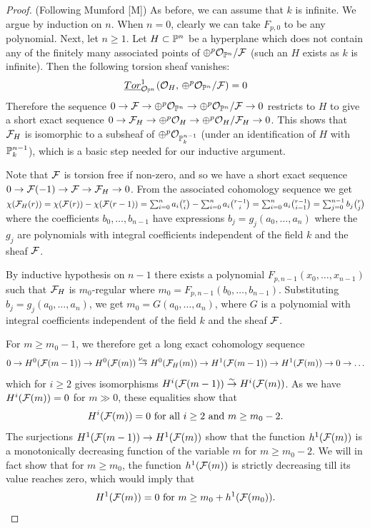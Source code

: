 \begin{proof} (Following Mumford [M])
As before, we can assume that $k$ is infinite. We argue by induction on $n$.
When $n=0$, clearly we can take $F_{p,0}$ to be any polynomial.
Next, let $n\ge 1$.
Let $H\subset \mathbb{P}^n$ be a hyperplane which does not contain
any of the finitely many associated points of
$\oplus^p{\mathcal O}_{\mathbb{P}^n}/\mathcal{F}$ (such an $H$ exists as $k$ is infinite).
Then the following torsion sheaf vanishes:
$$\underline{Tor}^1_{{\mathcal O}_{\mathbb{P}^n}}({\mathcal O}_H,\, \oplus ^p{\mathcal O}_{\mathbb{P}^n}/\mathcal{F})=0$$
Therefore the sequence
$0\to \mathcal{F} \to \oplus^p{\mathcal O}_{\mathbb{P}^n} \to \oplus^p{\mathcal O}_{\mathbb{P}^n}/\mathcal{F}\to 0$
restricts to $H$ to give a short exact sequence
$0\to \mathcal{F}_H \to \oplus^p{\mathcal O}_H \to \oplus^p{\mathcal O}_H/\mathcal{F}_H \to 0$.
This shows that $\mathcal{F}_H$ is isomorphic to a subsheaf of
$\oplus ^p{\mathcal O}_{\mathbb{P}^{n-1}_k}$ (under an identification of
$H$ with $\mathbb{P}^{n-1}_k$),
which is a basic step needed for our inductive argument.

Note that $\mathcal{F}$ is torsion free if non-zero, and so
we have a short exact sequence $0\to \mathcal{F}(-1) \to \mathcal{F} \to \mathcal{F}_H \to 0$.
From the associated cohomology sequence we get
$\chi(\mathcal{F}_H(r)) = \chi(\mathcal{F}(r)) - \chi(\mathcal{F}(r-1))
= \sum_{i=0}^n a_i {r\choose  i} - \sum_{i=0}^n a_i {r-1\choose i}
=  \sum_{i=0}^n a_i {r-1\choose i-1}= \sum_{j=0}^{n-1}b_j{r\choose j}$
where the coefficients $b_0,\ldots,b_{n-1}$ have
expressions $b_j = g_j(a_0,\ldots,a_n)$ where the $g_j$ are polynomials
with integral coefficients independent of the field $k$
and the sheaf $\mathcal{F}$.

By inductive hypothesis on $n-1$
there exists a polynomial $F_{p,n-1}(x_0,\ldots,x_{n-1})$
such that $\mathcal{F}_H$ is $m_0$-regular where
$m_0 = F_{p,n-1}(b_0,\ldots,b_{n-1})$.
Substituting $b_j = g_j(a_0,\ldots,a_n)$, we get
$m_0 = G(a_0,\ldots,a_n)$, where $G$ is a polynomial with
integral coefficients independent of the field $k$
and the sheaf $\mathcal{F}$.

For $m\ge m_0 -1$, we therefore get a long exact cohomology sequence
{\footnotesize
$$0\to H^0(\mathcal{F}(m-1))\to H^0(\mathcal{F}(m)) \stackrel{\nu_m}{\to} H^0(\mathcal{F}_H(m))
\to H^1(\mathcal{F}(m-1))\to H^1(\mathcal{F}(m)) \to 0 \to \ldots $$}
which for $i\ge 2$ gives isomorphisms
$H^i(\mathcal{F}(m-1))\stackrel{\sim}{\to} H^i(\mathcal{F}(m))$. As we have
$H^i(\mathcal{F}(m))=0$ for $m\gg 0$, these equalities show that
$$H^i(\mathcal{F}(m)) = 0\mbox{ for all }i\ge 2\mbox{ and }m\ge m_0-2.$$
The surjections $H^1(\mathcal{F}(m-1))\to H^1(\mathcal{F}(m))$ show that
the function $h^1(\mathcal{F}(m))$
is a monotonically decreasing function of the variable $m$ for $m\ge m_0 - 2$.
We will in fact show that for $m\ge m_0$, the function
$h^1(\mathcal{F}(m))$ is strictly decreasing  till its value reaches zero,
which would imply that
$$H^1(\mathcal{F}(m))=0 \mbox{ for }  m \ge m_0 + h^1(\mathcal{F}(m_0)).$$


\end{proof}
